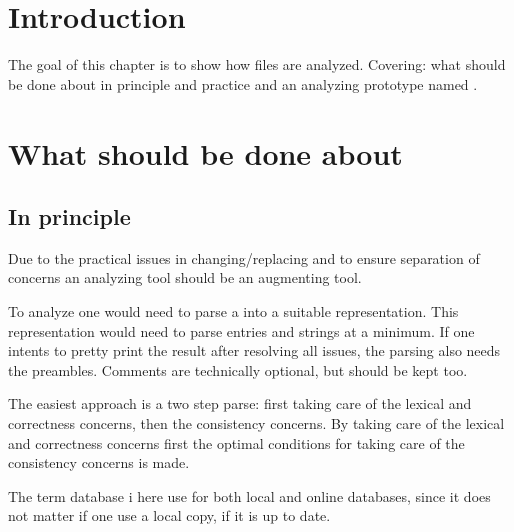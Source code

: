 

\section{Introduction}

The goal of this chapter is to show how {\bibtex} files are analyzed.
Covering: what should be done about {\bibtex} in principle and
practice  and an analyzing prototype
named {\orangutan} .


\section{What should be done about {\bibtex}}
\label{sec:analyzing_what_to_do}
\subsection{In principle}

Due to the practical issues in changing/replacing {\bibtex} and to
ensure separation of concerns an analyzing tool should be an
augmenting tool.

To analyze {\bibtex} one would need to parse a  into a
suitable representation.  This representation would need to parse
{\bibtex} entries and strings at a minimum.  If one intents to pretty
print the result after resolving all issues, the parsing also needs
the preambles.  Comments are technically optional, but should be kept
too.

The easiest approach is a two step parse: first taking care of the
lexical and correctness concerns, then the consistency concerns.  By
taking care of the lexical and correctness concerns first the optimal
conditions for taking care of the consistency concerns is made.

The term database i here use for both local and online databases,
since it does not matter if one use a local copy, if it is up to date.

